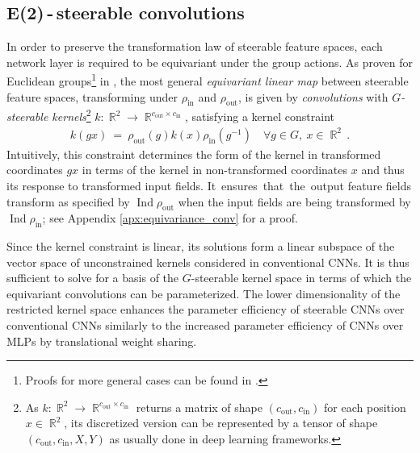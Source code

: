 \documentclass{article}
\newcommand{\apx}{Appendix\xspace
}
\DeclareMathOperator*{\R}{\mathbb{R}}
\newlength{\secBefore}
\newlength{\secAfter}
\newlength{\subsecBefore}
\newlength{\subsecAfter}
\begin{document}
\vspace*{\subsecBefore}
\subsection{E(2)\,-\,steerable convolutions}
\label{sec:steerable_convolutions}
\vspace*{\subsecAfter}

In order to preserve the transformation law of steerable feature spaces, each network layer is required to be equivariant under the group actions.
As proven for Euclidean groups\footnote{
    Proofs for more general cases can be found in \cite{Cohen2018-IIR,generaltheory}.
}
in \cite{3d_steerableCNNs}, the most general \emph{equivariant linear map} between 
steerable feature spaces, transforming under $\rho_\text{in}$ and $\rho_\text{out}$,
is given by \emph{convolutions} with $G$\emph{-steerable kernels}\footnote{
    As $k:\R^2\to\R^{c_\text{out}\times c_\text{in}}$ returns a matrix of shape $(c_\text{out},c_\text{in})$ for each position $x\in\R^2$, its discretized version can be represented by a tensor of shape $(c_\text{out},c_\text{in},X,Y)$ as usually done in deep learning frameworks.
}
$k:\R^2\to\R^{c_\text{out}\times c_\text{in}}$, satisfying a kernel constraint
\begin{align}\label{eq:kernel_constraint}
    k(gx)\ =\ \rho_\text{out}(g)k(x)\rho_\text{in}(g^{-1}) \quad\forall g\in G,\ x\in {\R}^2 \,.
\end{align}
Intuitively, this constraint determines the form of the kernel in transformed coordinates $gx$ in terms of the kernel in non-transformed coordinates $x$ and thus its response to transformed input fields.
It~ensures~that~the~output feature fields transform as specified by $\operatorname{Ind}\rho_\text{out}$ when the input fields are being transformed by $\operatorname{Ind}\rho_\text{in}$; see \apx \ref{apx:equivariance_conv} for a proof.

Since the kernel constraint is linear, its solutions form a linear subspace of the vector space of unconstrained kernels considered in conventional CNNs.
It is thus sufficient to solve for a basis of the $G$-steerable kernel space in terms of which the equivariant convolutions can be parameterized.
The lower dimensionality of the restricted kernel space enhances the parameter efficiency of steerable CNNs over conventional CNNs similarly to the increased parameter efficiency of CNNs over MLPs by translational weight sharing.

 	
\end{document}
